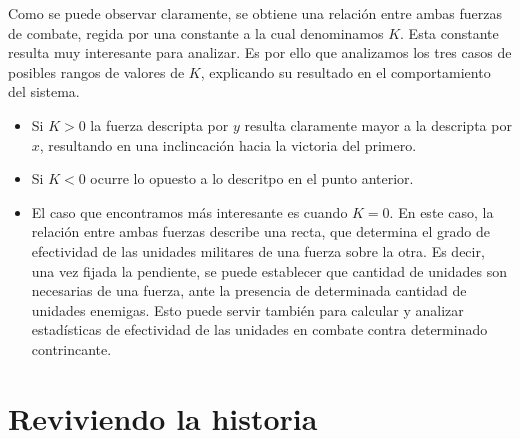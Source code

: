\documentclass[a4paper,10pt]{article}
\begin{document}
Como se puede observar claramente, se obtiene una relación entre ambas fuerzas de combate, regida por una constante a la cual denominamos $K$. 
Esta constante resulta muy interesante para analizar. Es por ello que analizamos los tres casos de posibles rangos de valores de $K$, explicando
su resultado en el comportamiento del sistema.
\begin{itemize}
\item Si $K>0$ la fuerza descripta por $y$ resulta claramente mayor a la descripta por $x$, resultando en una inclincación hacia la victoria
del primero.
\item Si $K<0$ ocurre lo opuesto a lo descritpo en el punto anterior.
\item El caso que encontramos más interesante es cuando $K=0$. En este caso, la relación entre ambas fuerzas describe una recta, que determina
el grado de efectividad de las unidades militares de una fuerza sobre la otra. Es decir, una vez fijada la pendiente, se puede establecer que
cantidad de unidades son necesarias de una fuerza, ante la presencia de determinada cantidad de unidades enemigas. Esto puede servir también
para calcular y analizar estadísticas de efectividad de las unidades en combate contra determinado contrincante.
\end{itemize}



\section{Reviviendo la historia}
\end{document}
